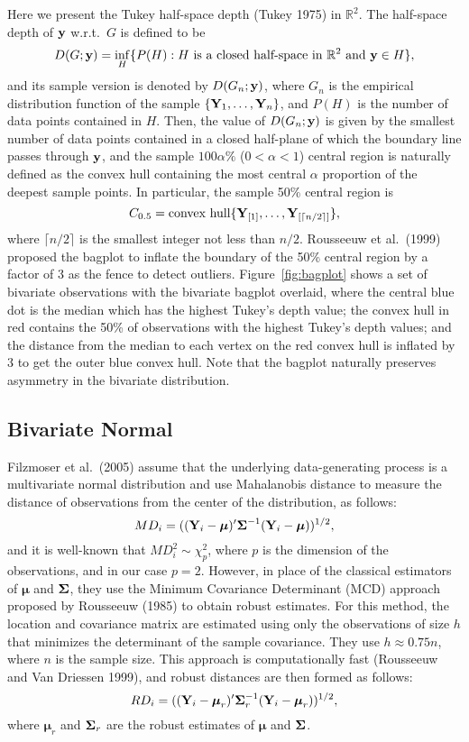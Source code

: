 \documentclass[12pt]{article}
\def\bmu{{\boldsymbol \mu}}
\def\bY{{\bf Y}}
\def\by{{\bf y}}
\def\bmu{{\boldsymbol \mu}}
\def\R{\mathbb R}
\def\R{\mathbb{R}}
\def\bY{{\bf Y}}
\def\by{{\bf y}}
\def\bSigma{{\ensuremath\boldsymbol{\Sigma}}}
\def\bSigma{{\ensuremath\boldsymbol{\Sigma}}}
\begin{document}
\begin{doublespacing}
Here we present the Tukey half-space depth (Tukey 1975) in $\R^2$. The half-space depth of $\by$ w.r.t.~$G$ is defined to be
$$D(G;\by)=\inf_H\{P(H):  H\mbox{ is a closed half-space in }\R^2\mbox{ and }\by\in H\},$$
and its sample version is denoted by $D(G_n;\by)$, where $G_n$ is the empirical distribution function of  the sample $\{\bY_1,\ldots ,\bY_n\}$, and $P(H)$ is the number of data points contained in $H$. Then, the value of $D(G_n;\by)$ is given by the smallest number of data points contained in a closed half-plane of which the boundary line passes through $\by$, and the sample $100\alpha\%$ ($0<\alpha<1$) central region is naturally defined as the convex hull containing the most central $\alpha$ proportion of the deepest sample points. In particular, the sample 50\% central region is
$$C_{0.5}=\mbox{convex hull}\{\bY_{[1]},\ldots,\bY_{[\lceil n/2\rceil]}\},$$
where  $\lceil n/2\rceil$ is the smallest integer not less than $n/2$. Rousseeuw et al.~(1999) proposed the bagplot to inflate the boundary of the 50\% central region by a factor of 3 as the fence to detect outliers. Figure~\ref{fig:bagplot} shows a set of bivariate observations with the bivariate bagplot overlaid, where the central blue dot is the median which has the highest Tukey's depth value; the convex hull in red contains the 50\% of observations with the highest Tukey's depth values;  and the distance from the median to each vertex on the red convex hull is inflated by 3 to get the outer blue convex hull. Note that the bagplot naturally preserves asymmetry in the bivariate distribution.  


 
\subsection{Bivariate Normal}\label{subsec:bvn}
 Filzmoser et al.~(2005) assume that the  underlying data-generating process is a multivariate normal distribution and use Mahalanobis distance to measure the distance of observations from the center of the distribution, as follows: $$MD_i = ((\bY_i-\bmu)'\bSigma^{-1}(\bY_i-\bmu))^{1/2},$$ and it is well-known that $MD_i^2\sim \chi^2_p$, where $p$ is the dimension of the observations, and in our case $p=2$.   However, in place of the classical estimators of $\bmu$ and $\bSigma$, they use the Minimum Covariance Determinant (MCD) approach proposed by Rousseeuw (1985) to obtain robust estimates.  For this method, the location and covariance matrix are estimated using only the observations of size $h$ that minimizes the determinant of the sample covariance.  They use $h\approx 0.75n$, where $n$ is the sample size.  This approach is computationally fast (Rousseeuw and Van Driessen 1999), and  robust distances  are then formed as follows:  $$RD_i = ((\bY_i-\bmu_r)'\bSigma_r^{-1}(\bY_i-\bmu_r))^{1/2},$$ where $\bmu_r$ and $\bSigma_r$ are the robust estimates of $\bmu$ and $\bSigma$.




\end{doublespacing}
\end{document}
